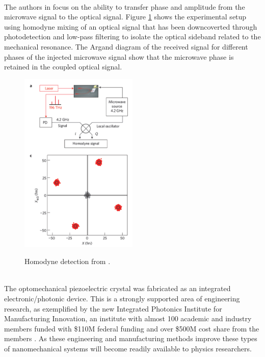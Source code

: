 \documentclass[a4paper,10pt,twocolumn]{article}
\numberwithin{equation}{section}
\begin{document}
\\
The authors in \cite{nanoCrystal} focus on the ability to transfer phase and amplitude from the microwave signal to the optical signal.
Figure \ref{fig:homodyne} shows the experimental setup using homodyne mixing of an optical signal that has been downcoverted through photodetection and low-pass filtering to isolate the optical sideband related to the mechanical resonance.
The Argand diagram of the received signal for different phases of the injected microwave signal show that the microwave phase is retained in the coupled optical signal.
\begin{figure}[ht]
 \caption{Homodyne detection from \cite{nanoCrystal}.}
 \centering
   \includegraphics[width=0.5\textwidth]{figs/CrystalMixing}
 \label{fig:homodyne}
\end{figure}
\\
The optomechanical piezoelectric crystal was fabricated as an integrated electronic/photonic device.
This is a strongly supported area of engineering research, as exemplified by the new Integrated Photonics Institute for Manufacturing Innovation, 
an institute with almost 100 academic and industry members funded with \$110M federal funding and over \$500M cost share from the members \cite{ipimi}.
As these engineering and manufacturing methods improve these types of nanomechanical systems will become readily available to physics researchers.
\end{document}
